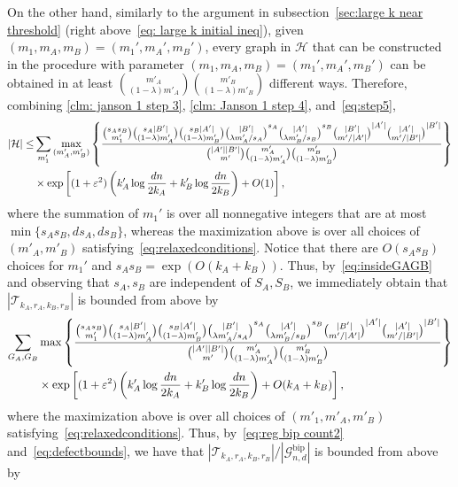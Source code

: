 \documentclass[11pt]{article}
\newcommand{\eps}{\varepsilon}
\theoremstyle{plain}
\begin{document}
On the other hand, similarly to the argument in subsection~\ref{sec:large k near threshold} (right above~\eqref{eq: large k initial ineq}),  given $(m_1,m_A,m_B)=(m_1',m_A',m_B')$, every graph in $\mathcal H$ that can be constructed in the procedure with parameter $(m_1,m_A,m_B)=(m_1',m_A',m_B')$  can be obtained in at least $\binom{m'_A}{(1 - \lambda )m'_A}\binom{m'_B}{(1 - \lambda )m'_B}$ different ways. Therefore, combining \cref{clm: janson 1 step 3},  \cref{clm: Janson 1 step 4}, and~\eqref{eq:step5},
\begin{align*}
|{\mathcal H}| \le &\sum_{m_1'}\max_{(m'_A, m'_B)}\left\{\frac{\binom{s_As_B}{m'_1}\binom{s_A|B'|}{(1 - \lambda )m'_A}\binom{s_B|A'|}{(1 - \lambda )m'_B}\binom{|B'|}{\lambda m'_A/s_A}^{s_A}\binom{|A'|}{\lambda m'_B/s_B}^{s_B}\binom{|B'|}{m'/|A'|}^{|A'|}\binom{|A'|}{m'/|B'|}^{|B'|}}                {\binom{|A'||B'|}{m'}\binom{m_A'}{(1 - \lambda )m_A'}\binom{m'_B}{(1 - \lambda )m'_B}}\right\}\notag\\
&\times\exp\left[(1 + \eps^2)\left(k'_A\log\frac{dn}{2k_A} + k'_B\log\frac{dn}{2k_B}\right) + O(1) \right],
\end{align*} 
where the summation of $m_1'$ is over all nonnegative integers that are at most \newline$\min\{s_As_B, ds_A, ds_B\}$, whereas the maximization above is over all choices of $(m'_A,m'_B)$ satisfying~\eqref{eq:relaxedconditions}. Notice that there are $O(s_As_B)$ choices for $m_1'$ and $s_As_B=\exp(O(k_A + k_B))$. Thus, by~\eqref{eq:insideGAGB} and observing that $s_A,s_B$ are independent of $S_A,S_B$, we immediately obtain that $|\mathcal T_{k_A, r_A, k_B, r_B}|$ is bounded from above by 
\begin{align*}
  \sum_{G_A,G_B}&\max\left\{\frac{\binom{s_As_B}{m'_1}\binom{s_A|B'|}{(1 - \lambda )m'_A}\binom{s_B|A'|}{(1 - \lambda )m'_B}\binom{|B'|}{\lambda m'_A/s_A}^{s_A}\binom{|A'|}{\lambda m'_B/s_B}^{s_B}\binom{|B'|}{m'/|A'|}^{|A'|}\binom{|A'|}{m'/|B'|}^{|B'|}}                {\binom{|A'||B'|}{m'}\binom{m_A'}{(1 - \lambda )m_A'}\binom{m'_B}{(1 - \lambda )m'_B}}\right\}\notag\\
&\times\exp\left[(1 + \eps^2)\left(k'_A\log\frac{dn}{2k_A} + k'_B\log\frac{dn}{2k_B}\right) + O(k_A + k_B) \right],
\end{align*}
where the maximization above is over all choices of $(m'_1,m'_A,m'_B)$ satisfying~\eqref{eq:relaxedconditions}. Thus, by~\eqref{eq:reg bip count2} and~\eqref{eq:defectbounds}, we have that $|\mathcal T_{k_A, r_A, k_B, r_B}|/|\mathcal G_{n,d}^\text{bip}|$ is bounded from above by 
\end{document}
